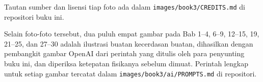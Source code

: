 Tautan sumber dan lisensi tiap foto ada dalam
\texttt{images/book3/CREDITS.md} di repositori buku ini.

\bigskip
Selain foto-foto tersebut, dua puluh empat gambar pada Bab 1--4, 6--9,
12--15, 19, 21--25, dan 27--30 adalah ilustrasi buatan kecerdasan
buatan, dihasilkan dengan pembangkit gambar OpenAI dari perintah yang
ditulis oleh para penyunting buku ini, dan diperiksa ketepatan
fisikanya sebelum dimuat. Perintah lengkap untuk setiap gambar
tercatat dalam \texttt{images/book3/ai/PROMPTS.md} di repositori.
\clearpage
